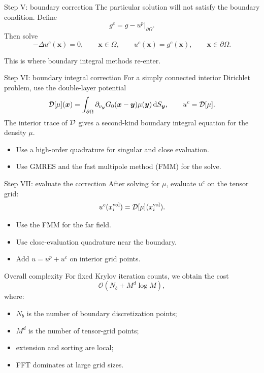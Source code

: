 \documentclass[aspectratio=169,11pt]{beamer}
\newcommand{\cO}{\mathcal{O}}
\newcommand{\dd}{\,\mathrm d}
\newcommand{\x}{\bm{x}}
\newcommand{\y}{\bm{y}}
\begin{document}
\begin{frame}{Step V: boundary correction}
\small
The particular solution will not satisfy the boundary condition.
Define
\[
  g^c=g-u^p|_{\partial\Omega}.
\]
Then solve
\[
  -\Delta u^c(\x)=0,\qquad \x\in\Omega,
  \qquad
  u^c(\x)=g^c(\x),\qquad \x\in\partial\Omega.
\]

\vspace{2mm}
This is where boundary integral methods re-enter.
\end{frame}

\begin{frame}{Step VI: boundary integral correction}
\small
For a simply connected interior Dirichlet problem, use the double-layer
potential
\[
  \Dop[\mu](\x)
  =
  \int_{\partial\Omega}
  \partial_{\nu_{\y}}G_0(\x-\y)\mu(\y)\dd S_{\y},
  \qquad
  u^c=\Dop[\mu].
\]
The interior trace of $\mathcal{D}$ gives a second-kind boundary integral equation
for the density $\mu$.

\begin{itemize}
  \item Use a high-order quadrature for singular and close evaluation.
  \item Use GMRES and the fast multipole method (FMM) for the solve.
\end{itemize}
\end{frame}

\begin{frame}{Step VII: evaluate the correction}
\small
After solving for $\mu$, evaluate $u^c$ on the tensor grid:
\[
  u^c(x_i^{\rm vol})
  =
  \mathcal{D}[\mu](x_i^{\rm vol}).
\]

\begin{itemize}
  \item Use the FMM for the far field.
  \item Use close-evaluation quadrature near the boundary.
  \item Add $u=u^p+u^c$ on interior grid points.
\end{itemize}
\end{frame}

\begin{frame}{Overall complexity}
\small
For fixed Krylov iteration counts, we obtain the cost
\[
  \cO(N_b+M^d\log M),
\]
where:
\begin{itemize}
  \item $N_b$ is the number of boundary discretization points;
  \item $M^d$ is the number of tensor-grid points;
  \item extension and sorting are local;
  \item FFT dominates at large grid sizes.
\end{itemize}
\end{frame}
\end{document}
